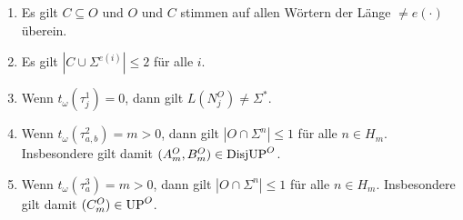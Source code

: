 \begin{claim}
    \begin{enumerate}
        \item Es gilt $C\subseteq O$ und $O$ und $C$ stimmen auf allen Wörtern der Länge $\neq e(\cdot)$ überein.
        \item Es gilt $|C\cup\Sigma^{e(i)}|\leq 2$ für alle $i$.
        \item Wenn $t_\omega(\tau^1_j)=0$, dann gilt $L(N_j^O)\neq\Sigma^*$.
        \item Wenn $t_\omega(\tau^2_{a,b})=m>0$, dann gilt $|O\cap \Sigma^n|\leq 1$ für alle $n\in H_m$. Insbesondere gilt damit $(A_m^O, B_m^O)\in\mathrm{DisjUP}^O$.
        \item Wenn $t_\omega(\tau^3_{a})=m>0$, dann gilt $|O\cap \Sigma^n|\leq 1$ für alle $n\in H_m$. Insbesondere gilt damit $(C_m^O)\in\mathrm{UP}^O$.
    \end{enumerate}
\end{claim}
